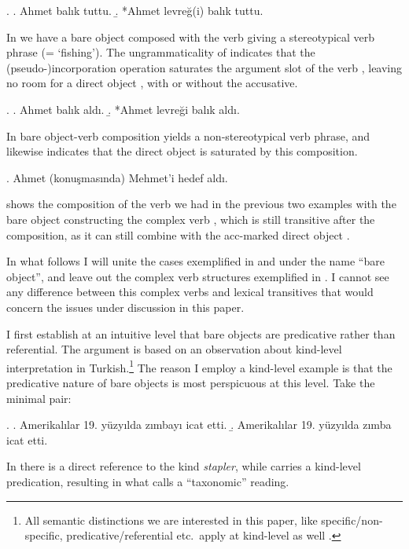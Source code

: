 \documentclass[11pt,a4paper]{article}
\begin{document}
\ex.
\label{exbalik1}
\a. Ahmet balık tuttu.
\b. *Ahmet levreğ(i) balık tuttu.

In  we have a bare object composed with the verb giving a stereotypical verb phrase (= `fishing'). The ungrammaticality of  indicates that the (pseudo-)incorporation operation saturates the argument slot of the verb , leaving no room for a direct object , with or without the accusative.

\ex.\label{exbalik2} 
\a.
Ahmet balık aldı.
\b.
*Ahmet levreği balık aldı.

In  bare object-verb composition yields a non-stereotypical verb phrase, and  likewise indicates that the direct object is saturated by this composition.

\ex.
\label{exbalik3}
Ahmet (konuşmasında) Mehmet'i hedef aldı.

 shows the composition of the verb we had in the previous two examples with the bare object  constructing the complex verb , which is still transitive after the composition, as it can still combine with the acc-marked direct object .

In what follows I will unite the cases exemplified in  and  under the name ``bare object'', and leave out the complex verb structures exemplified in . I cannot see any difference between this complex verbs and lexical transitives that would concern the issues under discussion in this paper.

I first establish at an intuitive level that bare objects are predicative rather than referential. The argument is based on an observation about kind-level interpretation in Turkish.\footnote{All semantic distinctions we are interested in this paper, like specific/non-specific, predicative/referential etc.\ apply at kind-level as well .} The reason I employ a kind-level example is that the predicative nature of bare objects is most perspicuous at this level. Take the minimal pair:

\ex.\label{exzimba}
\a. Amerikalılar 19. yüzyılda  zımbayı icat etti.
\b. Amerikalılar 19. yüzyılda zımba icat etti.

In  there is a direct reference to the kind \emph{stapler}, while  carries a kind-level predication, resulting in what  calls a ``taxonomic'' reading.
\end{document}
